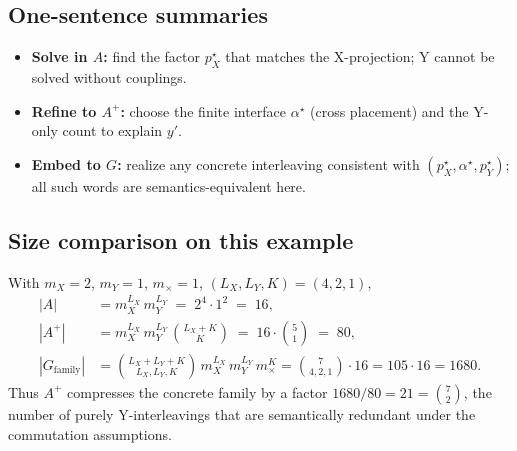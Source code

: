 \documentclass[11pt]{article}
\begin{document}
\subsection{One-sentence summaries}
\begin{itemize}
\item \textbf{Solve in $A$:} find the factor $p_X^\star$ that matches the X-projection; Y cannot be solved without couplings.
\item \textbf{Refine to $A^{+}$:} choose the finite interface $\alpha^\star$ (cross placement) and the Y-only count to explain $y'$.
\item \textbf{Embed to $G$:} realize any concrete interleaving consistent with $(p_X^\star,\alpha^\star,p_Y^\star)$; all such words are semantics-equivalent here.
\end{itemize}

\subsection{Size comparison on this example}
With $m_X=2$, $m_Y=1$, $m_\times=1$, $(L_X,L_Y,K)=(4,2,1)$,
\begin{align*}
|A| &= m_X^{L_X}\,m_Y^{L_Y} \;=\; 2^4\cdot 1^2 \;=\; 16,\\
|A^{+}| &= m_X^{L_X}\,m_Y^{L_Y}\,\binom{L_X+K}{K} \;=\; 16\cdot \binom{5}{1} \;=\; 80,\\
|G_{\text{family}}| &= \binom{L_X+L_Y+K}{L_X,L_Y,K}\,m_X^{L_X}\,m_Y^{L_Y}\,m_\times^{K}
= \binom{7}{4,2,1}\cdot 16 = 105\cdot 16 = 1680.
\end{align*}
Thus $A^{+}$ compresses the concrete family by a factor ${1680}/{80}=21=\binom{7}{2}$, the number of purely Y-interleavings
that are semantically redundant under the commutation assumptions.
\end{document}
